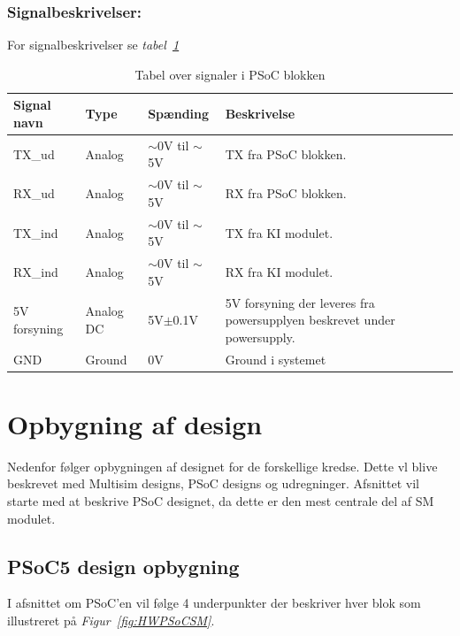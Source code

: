 \subsubsection{Signalbeskrivelser:}
For signalbeskrivelser se \textit{tabel~\ref{table:UARTSignalerSM}}
\begin{table}[H]
\begin{tabular}{|p{3cm}|p{3cm}|p{3cm}|p{4.5cm}|} \hline
\cellcolor[gray]{0.85}Signal navn& \cellcolor[gray]{0.85}Type &\cellcolor[gray]{0.85}Spænding&\cellcolor[gray]{0.85}Beskrivelse\\ \hline
TX\_ud & Analog & $\sim$0V til $\sim$5V & TX fra PSoC blokken.\\ \hline
RX\_ud & Analog & $\sim$0V til $\sim$5V & RX fra PSoC blokken. \\ \hline
TX\_ind & Analog & $\sim$0V til $\sim$5V & TX fra KI modulet.\\ \hline
RX\_ind & Analog & $\sim$0V til $\sim$5V & RX fra KI modulet. \\ \hline
5V forsyning & Analog DC & 5V$\pm$0.1V & 5V forsyning der leveres fra powersupplyen beskrevet under powersupply.\\ \hline
GND & Ground & 0V & Ground i systemet \\ \hline
\end{tabular}
\caption{Tabel over signaler i PSoC blokken}
\label{table:UARTSignalerSM}
\end{table}

\section{Opbygning af design}
Nedenfor følger opbygningen af designet for de forskellige kredse. Dette vl blive beskrevet med Multisim designs, PSoC designs og udregninger. Afsnittet vil starte med at beskrive PSoC designet, da dette er den mest centrale del af SM modulet.
\subsection{PSoC5 design opbygning}
I afsnittet om PSoC'en vil følge 4 underpunkter der beskriver hver blok som illustreret på \textit{Figur~\ref{fig:HWPSoCSM}}.

